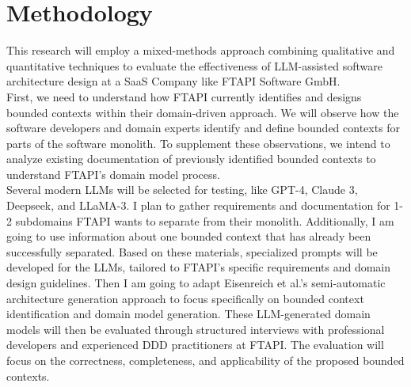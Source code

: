 \documentclass[12pt,a4paper]{article}
\begin{document}
\section{Methodology}
This research will employ a mixed-methods approach combining qualitative and quantitative techniques to evaluate the effectiveness of LLM-assisted software architecture design at a SaaS Company like FTAPI Software GmbH.\\ First, we need to understand how FTAPI currently identifies and designs bounded contexts within their domain-driven approach. We will observe how the software developers and domain experts identify and define bounded contexts for parts of the software monolith. To supplement these observations, we intend to analyze existing documentation of previously identified bounded contexts to understand FTAPI's domain model process. \\ Several modern LLMs will be selected for testing, like GPT-4, Claude 3, Deepseek, and LLaMA-3. I plan to gather requirements and documentation for 1-2 subdomains FTAPI wants to separate from their monolith. Additionally, I am going to use information about one bounded context that has already been successfully separated. Based on these materials, specialized prompts will be developed for the LLMs, tailored to FTAPI's specific requirements and domain design guidelines. Then I am going to adapt Eisenreich et al.'s semi-automatic architecture generation approach to focus specifically on bounded context identification and domain model generation. These LLM-generated domain models will then be evaluated through structured interviews with professional developers and experienced DDD practitioners at FTAPI. The evaluation will focus on the correctness, completeness, and applicability of the proposed bounded contexts.

\printbibliography
\end{document}
